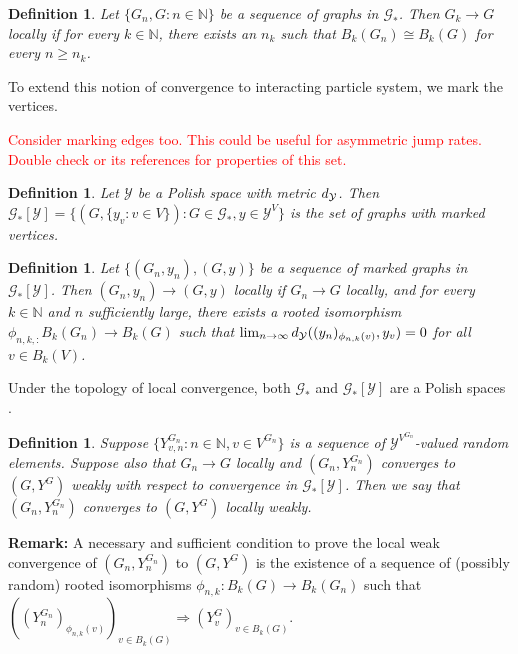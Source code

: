\documentclass[12pt]{article}
\newcommand{\skipLine}{\vspace{12pt}}
\newcommand{\mb}{\mathbb}
\newcommand{\mc}{\mathcal}
\newcommand{\ra}{\rightarrow}
\newcommand{\tr}{\textcolor{red}}
\newcommand{\remark}{\textbf{Remark: }}
\newcommand{\xg}{y}									%
\newcommand{\met}[2]{
\ifstrempty{#2}{
	d_{#1}}{
	d_{#1,#2}}}										%
\newcommand{\vind}[1]{_{#1}}						%
\newcommand{\gind}[1]{^{#1}}						%
\newcommand{\Gs}{\mc{G}_\ast}						%
\newcommand{\trnc}[1]{B_{#1}}						%
\newcommand{\spce}{\mc{Y}}							%
\renewcommand{\sp}[1]{[#1]}							%
\newcommand{\dit}[2]{_{#1,#2}}						%
\newcommand{\vindit}[2]{_{#1,#2}}					%
\newcommand{\Xg}{Y}									%
\renewcommand{\it}[1]{_{#1}}						%
\newtheorem{defn}[thms]{Definition}
\begin{document}
\begin{defn}
Let \(\{G\it{n},G:n\in\mb{N}\}\) be a sequence of graphs in \(\Gs\). Then \(G\it{k} \ra G\) locally if for every \(k \in \mb{N}\), there exists an \(n\it{k}\) such that \(\trnc{k}(G\it{n}) \cong \trnc{k}(G)\) for every \(n \geq n_k\).
\label{lwc::lc}
\end{defn}

To extend this notion of convergence to interacting particle system, we mark the vertices.

\skipLine

\tr{Consider marking edges too. This could be useful for asymmetric jump rates. Double check \cite{OliReiSto19} or its references for properties of this set.}

\begin{defn}
Let \(\spce\) be a Polish space with metric \(\met{\spce}{}\). Then \(\Gs\sp{\spce} = \{(G,\{\xg\vind{v}:v \in V\}): G \in \Gs, \xg\in \spce^V\}\) is the set of graphs with marked vertices.
\label{lwc::marked}
\end{defn}

\begin{defn}
Let \(\{(G\it{n},\xg\it{n}),(G,\xg)\}\) be a sequence of marked graphs in \(\Gs\sp{\spce}\). Then \((G\it{n},\xg\it{n}) \ra (G,\xg)\) locally if \(G\it{n} \ra G\) locally, and for every \(k \in \mb{N}\) and \(n\) sufficiently large, there exists a rooted isomorphism \(\phi\dit{n,k}:\trnc{k}(G\it{n}) \ra \trnc{k}(G)\) such that \(\lim_{n\ra\infty} \met{\spce}{}((\xg\it{n})\vind{\phi\dit{n}{k}(v)},\xg\vind{v}) = 0\) for all \(v \in \trnc{k}(V)\).
\label{lwc::mlc}
\end{defn}

Under the topology of local convergence, both \(\Gs\) and \(\Gs\sp{\spce}\) are a Polish spaces \cite[Lemmas A.2, A.3, and A.5]{LacRamWu19}.

\begin{defn}
Suppose \(\{\Xg\gind{G\it{n}}\vindit{v}{n}:n\in\mb{N},v \in V\gind{G\it{n}}\}\) is a sequence of \(\spce^{V\gind{G\it{n}}}\)-valued random elements. Suppose also that \(G\it{n} \ra G\) locally and \((G\it{n},\Xg\gind{G\it{n}}\it{n})\) converges to \((G,\Xg\gind{G})\) weakly with respect to convergence in \(\Gs\sp{\spce}\). Then we say that \((G\it{n},\Xg\gind{G\it{n}}\it{n})\) converges to \((G,\Xg\gind{G})\) locally weakly.
\label{lwc::lwc}
\end{defn}

\remark A necessary and sufficient condition to prove the local weak convergence of \((G\it{n},\Xg\gind{G\it{n}}\it{n})\) to \((G,\Xg\gind{G})\) is the existence of a sequence of (possibly random) rooted isomorphisms \(\phi_{n,k}: \trnc{k}(G) \ra \trnc{k}(G\it{n})\) such that \(\left((\Xg\gind{G\it{n}}\it{n})\vind{\phi_{n,k}(v)}\right)_{v\in \trnc{k}(G)} \Rightarrow \left(\Xg\gind{G}\vind{v}\right)_{v \in\trnc{k}(G)}\).
\end{document}
